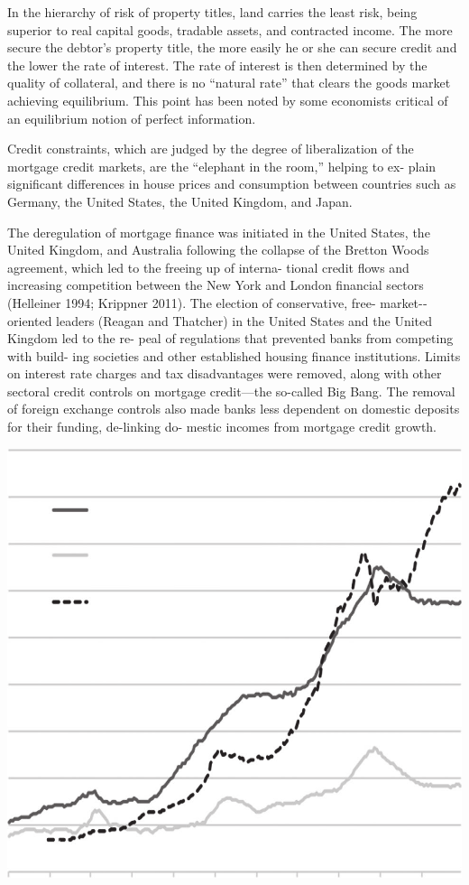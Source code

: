 \documentclass[
]{book}
\begin{document}
In the hierarchy of risk of property titles, land carries the least risk,
being superior to real capital goods, tradable assets, and contracted
income. The more secure the debtor's property title, the more easily he
or she can secure credit and the lower the rate of interest. The rate of
interest is then determined by the quality of collateral, and there is no
``natural rate'' that clears the goods market achieving equilibrium. This
point has been noted by some economists critical of an equilibrium
notion of perfect information.

Credit
constraints, which are judged by the degree of liberalization of the
mortgage credit markets, are the ``elephant in the room,'' helping to ex-
plain significant differences in house prices and consumption between
countries such as Germany, the United States, the United Kingdom,
and Japan.

The deregulation of mortgage finance was initiated in the United
States, the United Kingdom, and Australia following the collapse of
the Bretton Woods agreement, which led to the freeing up of interna-
tional credit flows and increasing competition between the New York
and London financial sectors (Helleiner 1994; Krippner 2011). The
election of conservative, free-­
market-­
oriented leaders (Reagan and
Thatcher) in the United States and the United Kingdom led to the re-
peal of regulations that prevented banks from competing with build-
ing societies and other established housing finance institutions. Limits
on interest rate charges and tax disadvantages were removed, along
with other sectoral credit controls on mortgage credit---­the so-­called
Big Bang. The removal of foreign exchange controls also made banks
less dependent on domestic deposits for their funding, de-­linking do-
mestic incomes from mortgage credit growth.

\includegraphics{fig/UK_House_Price_vs_Credit.png}
\end{document}

